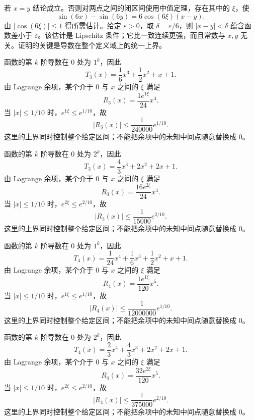 \documentclass[12pt,fontset=fandol]{ctexart}
\begin{document}
\begin{solve}\label{ans:c10q13}
若 $x=y$ 结论成立。否则对两点之间的闭区间使用中值定理，存在其中的 $\xi$，使
\[
\sin(6x)-\sin(6y)=6\cos(6\xi)(x-y).
\]
由 $|\cos(6\xi)|\le1$ 得所需估计。给定 $\varepsilon>0$，取 $\delta=\varepsilon/6$，则 $|x-y|<\delta$ 蕴含函数差小于 $\varepsilon$。该估计是 Lipschitz 条件；它比一致连续更强，而且常数与 $x,y$ 无关。证明的关键是导数在整个定义域上的统一上界。
\end{solve}

\begin{solve}\label{ans:c10q14}
函数的第 $k$ 阶导数在 $0$ 处为 $1^k$，因此
\[
T_{3}(x)=\frac{1}{6}x^{3}+\frac{1}{2}x^{2}+x+1.
\]
由 Lagrange 余项，某个介于 $0$ 与 $x$ 之间的 $\xi$ 满足
\[
R_{3}(x)=\frac{1e^{1\xi}}{24}x^{4}.
\]
当 $|x|\le1/10$ 时，$e^{1\xi}\le e^{1/10}$，故
\[
|R_{3}(x)|\le \frac{1}{240000}e^{1/10}.
\]
这里的上界同时控制整个给定区间；不能把余项中的未知中间点随意替换成 $0$。
\end{solve}

\begin{solve}\label{ans:c10q15}
函数的第 $k$ 阶导数在 $0$ 处为 $2^k$，因此
\[
T_{3}(x)=\frac{4}{3}x^{3}+2x^{2}+2x+1.
\]
由 Lagrange 余项，某个介于 $0$ 与 $x$ 之间的 $\xi$ 满足
\[
R_{3}(x)=\frac{16e^{2\xi}}{24}x^{4}.
\]
当 $|x|\le1/10$ 时，$e^{2\xi}\le e^{2/10}$，故
\[
|R_{3}(x)|\le \frac{1}{15000}e^{2/10}.
\]
这里的上界同时控制整个给定区间；不能把余项中的未知中间点随意替换成 $0$。
\end{solve}

\begin{solve}\label{ans:c10q16}
函数的第 $k$ 阶导数在 $0$ 处为 $1^k$，因此
\[
T_{4}(x)=\frac{1}{24}x^{4}+\frac{1}{6}x^{3}+\frac{1}{2}x^{2}+x+1.
\]
由 Lagrange 余项，某个介于 $0$ 与 $x$ 之间的 $\xi$ 满足
\[
R_{4}(x)=\frac{1e^{1\xi}}{120}x^{5}.
\]
当 $|x|\le1/10$ 时，$e^{1\xi}\le e^{1/10}$，故
\[
|R_{4}(x)|\le \frac{1}{12000000}e^{1/10}.
\]
这里的上界同时控制整个给定区间；不能把余项中的未知中间点随意替换成 $0$。
\end{solve}

\begin{solve}\label{ans:c10q17}
函数的第 $k$ 阶导数在 $0$ 处为 $2^k$，因此
\[
T_{4}(x)=\frac{2}{3}x^{4}+\frac{4}{3}x^{3}+2x^{2}+2x+1.
\]
由 Lagrange 余项，某个介于 $0$ 与 $x$ 之间的 $\xi$ 满足
\[
R_{4}(x)=\frac{32e^{2\xi}}{120}x^{5}.
\]
当 $|x|\le1/10$ 时，$e^{2\xi}\le e^{2/10}$，故
\[
|R_{4}(x)|\le \frac{1}{375000}e^{2/10}.
\]
这里的上界同时控制整个给定区间；不能把余项中的未知中间点随意替换成 $0$。
\end{solve}
\end{document}
